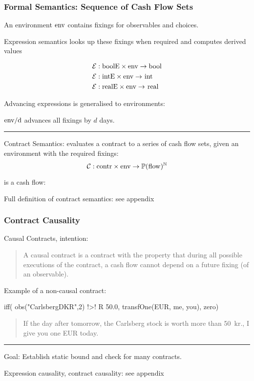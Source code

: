 \documentclass[xcolor=dvipsnames,11pt]{beamer}
\renewcommand{\emph}[1]{\textcolor{structure!90}{#1}}
\newcommand{\ttt}[1]{\mbox{\cd{#1}}}
\begin{document}
\begin{frame}
    \frametitle{Formal Semantics: Sequence of Cash Flow Sets}

An environment $\ttt{env}$ contains fixings for observables and choices.

\emph{Expression semantics} looks up these fixings when required
and computes derived values
\vspace*{-2ex}

{\footnotesize
\begin{align*}
  \mathcal{E} & : \ttt{boolE} \times \ttt{env} \rightarrow \ttt{bool}\\
    \mathcal{E} & : \ttt{intE} \times \ttt{env} \rightarrow \ttt{int}\\
  \mathcal{E} & : \ttt{realE} \times \ttt{env} \rightarrow \ttt{real}
\end{align*}}

\vspace*{-2ex}
Advancing expressions is generalised to environments: 

\hfill $ \ttt{env/d}$ advances all fixings by $d$ days.

\medskip

\hrule
\medskip

\emph{Contract Semantics}:
evaluates a contract to a series of cash flow sets,
given an environment with the required fixings:
%
\vspace*{-1ex}
$$ \mathcal{C} : \ttt{contr} \times \ttt{env} 
          \rightarrow \mathbb{P}(\ttt{flow})^\mathbb{N}$$

 is a cash flow: 

\vfill
{\scriptsize Full definition of contract semantics: see appendix}

\end{frame}

\begin{frame}[fragile,t]
    \frametitle{Contract Causality}

\emph{Causal Contracts, intention:}
{%
\begin{quote}
 A \emph{causal contract} is a contract with the property that during all
   possible executions of the contract, a cash flow cannot depend on a
   future fixing (of an observable).
\end{quote}}

\emph{Example of a non-causal contract:}

\begin{mlcode}
iff( obs("CarlsbergDKR",2) !>! R 50.0,
                              transfOne(EUR, me, you), zero)
\end{mlcode}
{\footnotesize
\begin{quote}
  If \emph{the day after tomorrow}, 
           the Carlsberg stock is worth more than 50~kr.,
           I give you one EUR \emph{today}.
\end{quote}}

\medskip
\hrule
\medskip

\emph{Goal}: Establish static bound and check for many contracts.

\vfill
{\scriptsize Expression causality, contract causality: see appendix}
\end{frame}
\end{document}
